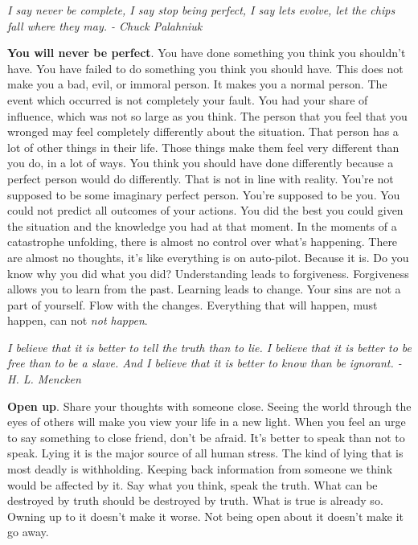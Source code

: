 \documentclass[a4paper,hidelinks]{article}
\begin{document}
\newpage

\begin{center}
\textit{
I say never be complete, I say stop being perfect, I say lets evolve, let the chips fall where they may. - Chuck Palahniuk
}
\end{center}

\textbf{You will never be perfect}.
You have done something you think you shouldn't have.
You have failed to do something you think you should have.
This does not make you a bad, evil, or immoral person.
It makes you a normal person.
The event which occurred is not completely your fault.
You had your share of influence, which was not so large as you think.
The person that you feel that you wronged may feel completely differently about the situation.
That person has a lot of other things in their life.
Those things make them feel very different than you do, in a lot of ways.
You think you should have done differently because a perfect person would do differently.
That is not in line with reality.
You're not supposed to be some imaginary perfect person.
You're supposed to be you.
You could not predict all outcomes of your actions.
You did the best you could given the situation and the knowledge you had at that moment.
In the moments of a catastrophe unfolding, there is almost no control over what's happening.
There are almost no thoughts, it's like everything is on auto-pilot.
Because it is.
Do you know why you did what you did?
Understanding leads to forgiveness.
Forgiveness allows you to learn from the past.
Learning leads to change.
Your sins are not a part of yourself.
Flow with the changes.
Everything that will happen, must happen, can not \textit{not happen}.

\newpage

\begin{center}
\textit{
I believe that it is better to tell the truth than to lie. I believe that it is better to be free than to be a slave. And I believe that it is better to know than be ignorant. - H. L. Mencken
}
\end{center}

\textbf{Open up}.
Share your thoughts with someone close.
Seeing the world through the eyes of others will make you view your life in a new light.
When you feel an urge to say something to close friend, don't be afraid.
It's better to speak than not to speak.
Lying it is the major source of all human stress.
The kind of lying that is most deadly is withholding.
Keeping back information from someone we think would be affected by it.
Say what you think, speak the truth.
What can be destroyed by truth should be destroyed by truth.
What is true is already so.
Owning up to it doesn't make it worse.
Not being open about it doesn't make it go away.
\end{document}
